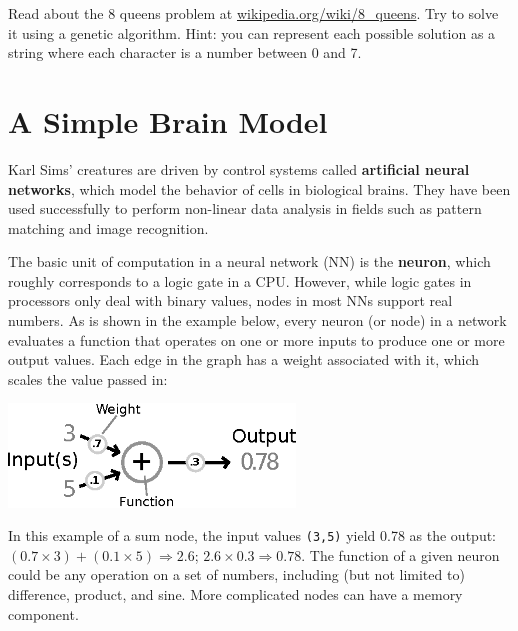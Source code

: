 \documentclass[10pt]{book}
\begin{document}
\begin{ex}
  Read about the 8 queens problem at \url{wikipedia.org/wiki/8_queens}.
  Try to solve it using a genetic algorithm. Hint: you can represent
  each possible solution as a string where each character is a number
  between 0 and 7.
\end{ex}

\section{A Simple Brain Model}

Karl Sims' creatures are driven by control systems called {\bf artificial neural
networks}, which model the behavior of cells in biological brains. They 
have been used successfully to perform non-linear data analysis in fields such as
pattern matching and image recognition.

The basic unit of computation in a neural network (NN) is the {\bf neuron}, which
roughly corresponds to a logic gate in a CPU. However, while logic gates in 
processors only deal with binary values, nodes in most NNs support real numbers.
As is shown in the example below, every neuron (or node) in a network evaluates a 
function that operates on one or more inputs to produce one or more output values. 
Each edge in the graph has a weight associated with it, which scales the value passed in: %

\beforefig
\centerline{\includegraphics[width=3in]{./figs/Neuron.eps}}
\afterfig

In this example of a sum node, the input values {\tt (3,5)} yield 0.78 as the output: 
$(0.7\times 3)+(0.1\times 5) \Rightarrow 2.6$; $2.6 \times 0.3 \Rightarrow 0.78$. 
The function of a given neuron could be any operation on a set of numbers, including 
(but not limited to) difference, product, and sine. More complicated nodes can 
have a memory component. %

\end{document}
